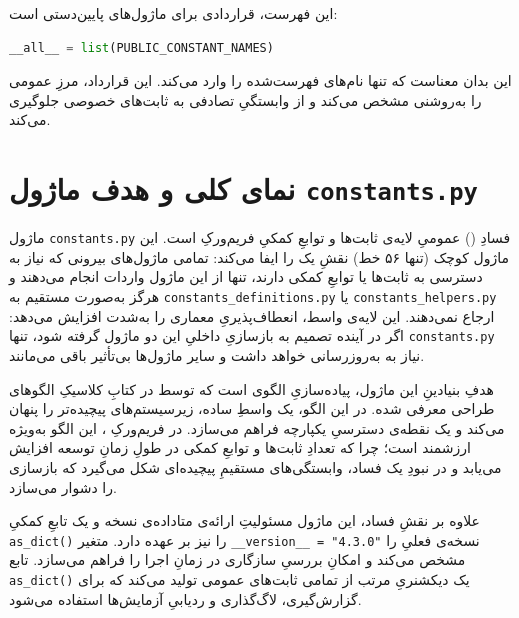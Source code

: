 این فهرست، قراردادی برای ماژول‌های پایین‌دستی است:

\begin{lstlisting}[language=Python]
	__all__ = list(PUBLIC_CONSTANT_NAMES)
\end{lstlisting}

این بدان معناست که  تنها نام‌های فهرست‌شده را وارد می‌کند. این قرارداد، مرزِ  عمومی را به‌روشنی مشخص می‌کند و از وابستگیِ تصادفی به ثابت‌های خصوصی جلوگیری می‌کند.


\section{نمای کلی و هدف ماژول \texttt{constants.py}}

ماژول \texttt{constants.py} فسادِ () عمومیِ لایه‌ی ثابت‌ها و توابعِ کمکیِ فریم‌ورکِ  است. این ماژول کوچک (تنها ۵۶ خط) نقشِ یک  را ایفا می‌کند: تمامی ماژول‌های بیرونی که نیاز به دسترسی به ثابت‌ها یا توابعِ کمکی دارند، تنها از این ماژول واردات انجام می‌دهند و هرگز به‌صورت مستقیم به \texttt{constants\_definitions.py} یا \texttt{constants\_helpers.py} ارجاع نمی‌دهند. این لایه‌ی واسط، انعطاف‌پذیریِ معماری را به‌شدت افزایش می‌دهد: اگر در آینده تصمیم به بازسازیِ داخلیِ این دو ماژول گرفته شود، تنها \texttt{constants.py} نیاز به به‌روزرسانی خواهد داشت و سایر ماژول‌ها بی‌تأثیر باقی می‌مانند.

هدفِ بنیادینِ این ماژول، پیاده‌سازیِ الگوی  است که توسط  در کتابِ کلاسیکِ الگوهای طراحی معرفی شده. در این الگو، یک واسطِ ساده، زیرسیستم‌های پیچیده‌تر را پنهان می‌کند و یک نقطه‌ی دسترسیِ یکپارچه فراهم می‌سازد. در فریم‌ورکِ ، این الگو به‌ویژه ارزشمند است؛ چرا که تعدادِ ثابت‌ها و توابعِ کمکی در طولِ زمانِ توسعه افزایش می‌یابد و در نبودِ یک فساد، وابستگی‌های مستقیمِ پیچیده‌ای شکل می‌گیرد که بازسازی را دشوار می‌سازد.

علاوه بر نقشِ فساد، این ماژول مسئولیتِ ارائه‌ی متاداده‌ی نسخه و یک تابعِ کمکیِ \texttt{as\_dict()} را نیز بر عهده دارد. متغیر \texttt{\_\_version\_\_ = "4.3.0"} نسخه‌ی فعلیِ  را مشخص می‌کند و امکانِ بررسیِ سازگاری در زمانِ اجرا را فراهم می‌سازد. تابع \texttt{as\_dict()} یک دیکشنریِ مرتب از تمامی ثابت‌های عمومی تولید می‌کند که برای گزارش‌گیری، لاگ‌گذاری و ردیابیِ آزمایش‌ها استفاده می‌شود.

